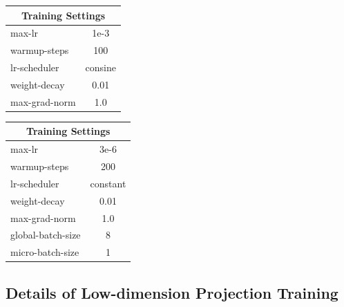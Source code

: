 \documentclass{llmxive}
\providecommand{\arraystretch}{0.94}
\begin{document}
\begin{table}[t]
    \centering
    \begin{minipage}[t]{0.49\linewidth}
        \centering
        \normalsize
        \setlength{\tabcolsep}{6pt}
        \renewcommand{\arraystretch}{1.10}
        \label{tab:appendix_stage1_settings}
        \begin{tabular}{lc}
            \toprule
            \multicolumn{2}{c}{\textbf{Training Settings}} \\
            \midrule
            max-lr & 1e-3 \\
            warmup-steps & 100 \\
            lr-scheduler & consine \\
            weight-decay & 0.01 \\
            max-grad-norm & 1.0 \\
            \bottomrule
        \end{tabular}
    \end{minipage}\hfill
    \begin{minipage}[t]{0.49\linewidth}
        \centering
        \normalsize
        \setlength{\tabcolsep}{6pt}
        \renewcommand{\arraystretch}{1.10}
        \label{tab:appendix_stage2_settings}
        \begin{tabular}{lc}
            \toprule
            \multicolumn{2}{c}{\textbf{Training Settings}} \\
            \midrule
            max-lr & 3e-6 \\
            warmup-steps & 200 \\
            lr-scheduler & constant \\
            weight-decay & 0.01 \\
            max-grad-norm & 1.0 \\
            global-batch-size & 8 \\
            micro-batch-size & 1 \\
            \bottomrule
        \end{tabular}
    \end{minipage}
\end{table}

\subsection{Details of Low-dimension Projection Training}
\label{appd:train_stage_1}
\end{document}
